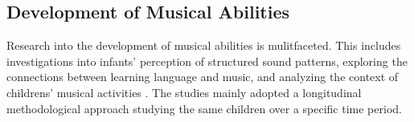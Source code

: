 \subsection{Development of Musical Abilities}

%
Research into the development of musical abilities is mulitfaceted. This includes investigations into infants' perception of structured sound patterns, exploring the connections between learning language and music, and analyzing the context of childrens' musical activities \cite{Forrester2015}. The studies mainly adopted a longitudinal methodological approach studying the same children over a specific time period. 
%
%
%
%


